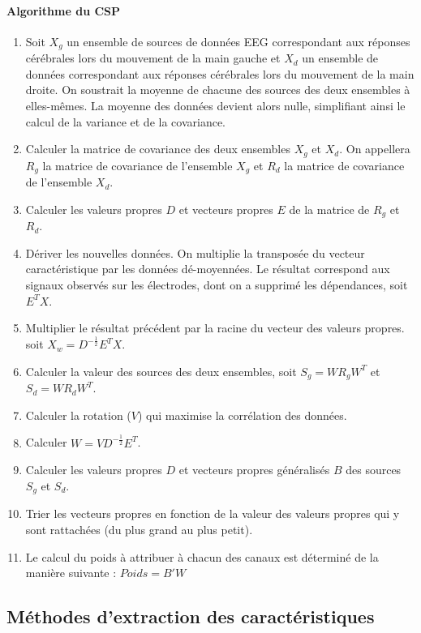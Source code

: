 \paragraph{Algorithme du CSP}
\begin{enumerate}
	\item Soit $X_g$ un ensemble de sources de données EEG  correspondant aux réponses cérébrales lors du mouvement de la main gauche et $X_d$ un ensemble de données correspondant aux réponses cérébrales lors du mouvement de la main droite. On soustrait la moyenne de chacune des sources des deux ensembles à elles-mêmes. La moyenne des données devient alors nulle, simplifiant ainsi le calcul de la variance et de la covariance.
	\item Calculer la matrice de covariance des deux ensembles $X_g$ et $X_d$. On appellera $R_g$ la matrice de covariance de l'ensemble $X_g$ et $R_d$ la matrice de covariance de l'ensemble $X_d$.
	\item Calculer les valeurs propres $D$ et vecteurs propres $E$ de la matrice de $R_g$ et $R_d$.
	\item Dériver les nouvelles données. On multiplie la transposée du vecteur caractéristique par les données dé-moyennées. Le résultat correspond aux signaux observés sur les électrodes, dont on a supprimé les dépendances, soit $E^TX$.
	\item Multiplier le résultat précédent par la racine du vecteur des valeurs propres. soit $X_w = D^{-\frac{1}{2}}E^TX$.
	\item Calculer la valeur des sources des deux ensembles, soit $S_g = WR_gW^T$ et $S_d = WR_dW^T$.
	\item Calculer la rotation ($V$) qui maximise la corrélation des données. 
	\item Calculer $W = VD^{-\frac{1}{2}}E^T$.
	\item Calculer les valeurs propres $D$ et vecteurs propres généralisés $B$ des sources $S_g$ et $S_d$.
	\item Trier les vecteurs propres en fonction de la valeur des valeurs propres qui y sont rattachées (du plus grand au plus petit).
	\item Le calcul du poids à attribuer à chacun des canaux est déterminé de la manière suivante : $Poids = B'W$
\end{enumerate}


\subsection{Méthodes d'extraction des caractéristiques}
\label{Subsecton : 4.Méthodes d'extraction des caractéristiques}

